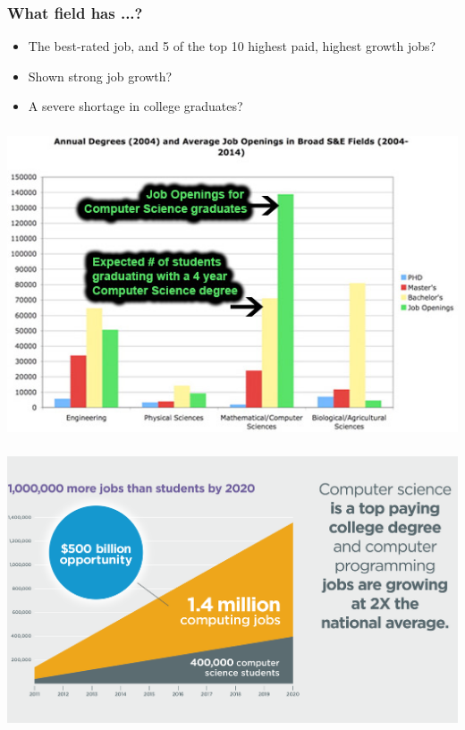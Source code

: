 \documentclass{beamer}
\begin{document}
\begin{frame}
  \frametitle{What field has ...?}
  \begin{itemize}
		\item The best-rated job, and 5 of the top 10 highest paid, highest growth jobs? 

 		\item Shown strong job growth?

 		\item A severe shortage in college graduates?
    \end{itemize}
    \vspace{0.3in}
    \pause
    \centering {\huge{\textcolor{red}{Computer Science!}}}
\end{frame}
\begin{frame}
  \frametitle{}
\begin{center}
\includegraphics[scale=0.55]{images/jobs3}
\end{center}
\end{frame}
\begin{frame}
  \frametitle{}
\begin{center}
\includegraphics[scale=0.4]{images/jobs}
\end{center}
\end{frame}
\end{document}
